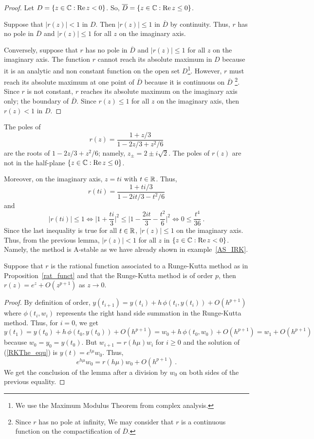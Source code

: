 \begin{proof}
Let $D = \{ z\in\mathbb{C} : \operatorname{Re} z<0\}$.  So,
$\overline{D} =  \{ z\in\mathbb{C} : \operatorname{Re} z \leq 0\}$.

Suppose that $|r(z)| <1$ in $D$.  Then $|r(z)| \leq 1$ in
$\overline{D}$ by continuity.  Thus, $r$ has no pole in
$\overline{D}$ and $|r(z)| \leq 1$ for all $z$ on the imaginary axis.

Conversely, suppose that $r$ has no pole in $\overline{D}$ and
$|r(z)| \leq 1$ for all $z$ on the imaginary axis.  The function $r$
cannot reach its absolute
maximum in $D$ because it is an analytic and non constant function on
the open set $D$\footnote{We use the Maximum Modulus Theorem from
complex analysis.}.  However, $r$ must reach its absolute maximum at one
point of $\overline{D}$ because it is continuous on
$\overline{D}$ \footnote{Since $r$ has no pole at infinity, We may
consider that $r$ is a continuous function on the compactification 
of $\overline{D}$.}.  Since $r$ is not constant, $r$
reaches its absolute maximum on the imaginary axis only; the
boundary of $\overline{D}$.  Since $r(z) \leq 1$ for all $z$ on the
imaginary axis, then $r(z) < 1$ in $D$.
\end{proof}

\begin{egg}
The poles of
\[
r(z) = \frac{1+ z/3}{1-2z/3+z^2/6}
\]
are the roots of $1-2z/3+z^2/6$; namely,
$z_{\pm} = 2\pm i\sqrt{2}$.  The poles of $r(z)$ are not in
the half-plane $\{ z\in\mathbb{C} : \operatorname{Re} z\leq 0\}$.

Moreover, on the imaginary axis, $z=ti$ with $t\in \mathbb{R}$. Thus,
\[
r(ti) = \frac{1+ti/3}{1-2it/3-t^2/6}
\]
and
\[
|r(ti)|\leq 1 \Leftrightarrow
\bigg| 1+\frac{ti}{3} \bigg|^2 \leq
\bigg| 1-\frac{2it}{3}-\frac{t^2}{6} \bigg|^2
\Leftrightarrow
0 \leq \frac{t^4}{36} \ .
\]
Since the last inequality is true for all $t \in \mathbb{R}$, $|r(z)|\leq 1$
on the imaginary axis.  Thus, from the previous lemma, $|r(z)| <1$ for
all $z$ in $\{z \in\mathbb{C} : \operatorname{Re} z<0\}$.  Namely, the method is
A-stable as we have already shown in example~\ref{AS_IRK}.
\end{egg}

\begin{lemma}
Suppose that $r$ is the rational function associated to a Runge-Kutta
method as in Proposition~\ref{rat_funct} and that the Runge-Kutta method is
of order $p$, then $r(z) = e^z +O(z^{p+1})$ as $z \rightarrow 0$.
\label{exp_approx}
\end{lemma}

\begin{proof}
By definition of order,
$y(t_{i+1}) = y(t_i) + h\,\phi(t_i,y(t_i)) + O(h^{p+1})$ where
$\phi(t_i,w_i)$ represents the right hand side summation in the
Runge-Kutta method.  Thus, for $i=0$, we get
\[
y(t_1) = y(t_0) + h\,\phi(t_0,y(t_0)) + O(h^{p+1})
= w_0 + h\,\phi(t_0,w_0) + O(h^{p+1}) = w_1+O(h^{p+1})
\]
because $w_0 = y_0 = y(t_0)$.
But $w_{i+1} = r(h\mu)w_i$ for $i\geq 0$ and the solution
of (\ref{RKThe_equ}) is $y(t) = e^{t\mu}w_0$.  Thus,
\[
  e^{h\mu}w_0 = r(h\mu)w_0 + O(h^{p+1}) \ .
\]
We get the conclusion of the lemma after a division by $w_0$ on both
sides of the previous equality.
\end{proof}

